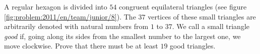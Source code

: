 %
\label{problem:2011/en/team/junior/8}%
A regular hexagon is divided into $54$ congruent equilateral triangles
(see figure \ref{fig:problem:2011/en/team/junior/8}).
The $37$ vertices of these small triangles are arbitrarily denoted with natural
numbers from $1$ to $37$.
We call a small triangle \emph{good} if, going along its sides from the
smallest number to the largest one, we move clockwise.
Prove that there must be at least $19$ good triangles.

\solution

\endproblem
